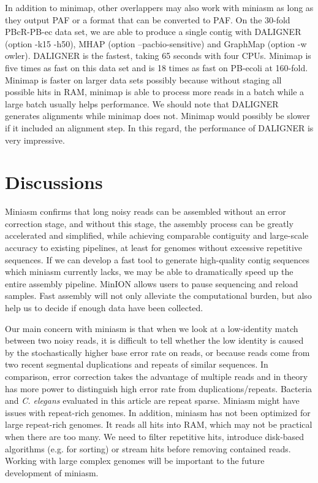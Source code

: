 \documentclass{bioinfo}
\begin{document}
In addition to minimap, other overlappers may also work with miniasm as long as
they output PAF or a format that can be converted to PAF.  On the 30-fold
PBcR-PB-ec data set, we are able to produce a single contig with DALIGNER
(option -k15 -h50), MHAP (option \mbox{--pacbio-sensitive}) and GraphMap
(option -w owler). DALIGNER is the fastest, taking 65 seconds with four CPUs.
Minimap is five times as fast on this data set and is 18 times as fast on
PB-ecoli at 160-fold. Minimap is faster on larger data sets possibly because
without staging all possible hits in RAM, minimap is able to process more reads
in a batch while a large batch usually helps performance. We should note that
DALIGNER generates alignments while minimap does not. Minimap would possibly be
slower if it included an alignment step. In this regard, the performance of DALIGNER is very
impressive.

\section{Discussions}

Miniasm confirms that long noisy reads can be assembled without
an error correction stage, and without this stage, the assembly process can be
greatly accelerated and simplified, while achieving comparable contiguity and
large-scale accuracy to existing pipelines, at least for genomes without
excessive repetitive sequences. If we can develop a fast tool to generate
high-quality contig sequences which miniasm currently lacks, we may be able to
dramatically speed up the entire assembly pipeline. MinION allows
users to pause sequencing and reload samples. Fast assembly will not only
alleviate the computational burden, but also help us to decide if enough data
have been collected.

Our main concern with miniasm is that when we look at a low-identity match
between two noisy reads, it is difficult to tell whether the low identity is
caused by the stochastically higher base error rate on reads, or because
reads come from two recent segmental duplications and repeats of similar sequences. 
In comparison, error correction takes the advantage of multiple reads and in
theory has more power to distinguish high error rate from duplications/repeats.
Bacteria and {\it C. elegans} evaluated in this article are repeat sparse.
Miniasm might have issues with repeat-rich genomes.  In addition, miniasm has
not been optimized for large repeat-rich genomes. It reads all hits into RAM,
which may not be practical when there are too many. We need to filter
repetitive hits, introduce disk-based algorithms (e.g. for sorting) or stream
hits before removing contained reads. Working with large complex genomes will
be important to the future development of miniasm.
\end{document}
